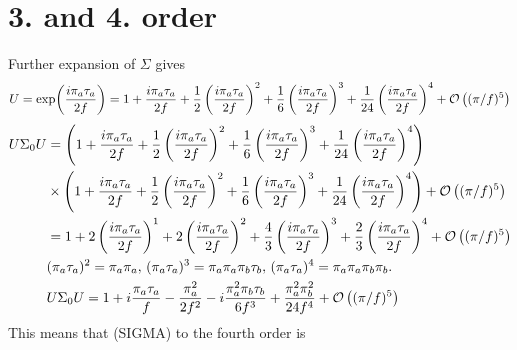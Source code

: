 \documentclass{article}
\begin{document}
\section{3. and 4. order}
Further expansion of $\Sigma$ gives
\begin{align*}
    U = \exp(\frac{i \pi_a \tau_a}{2f}) = 
    1
    + \frac{i \pi_a \tau_a}{2f} 
    + \frac{1}{2}\left(\frac{i \pi_a \tau_a}{2f}\right)^2 
    + \frac{1}{6}\left(\frac{i \pi_a \tau_a}{2f}\right)^3 
    + \frac{1}{24}\left(\frac{i \pi_a \tau_a}{2f}\right)^4 
    + \Oh[5]{(\pi/f)}
\end{align*}
\begin{align*}
    U\Sigma_0U & = 
    \left(
        1
        + \frac{i \pi_a \tau_a}{2f} 
        + \frac{1}{2}\left(\frac{i \pi_a \tau_a}{2f}\right)^2 
        + \frac{1}{6}\left(\frac{i \pi_a \tau_a}{2f}\right)^3 
        + \frac{1}{24}\left(\frac{i \pi_a \tau_a}{2f}\right)^4 
    \right)\\
    & \times
    \left(
        1
        + \frac{i \pi_a \tau_a}{2f} 
        + \frac{1}{2}\left(\frac{i \pi_a \tau_a}{2f}\right)^2 
        + \frac{1}{6}\left(\frac{i \pi_a \tau_a}{2f}\right)^3 
        + \frac{1}{24}\left(\frac{i \pi_a \tau_a}{2f}\right)^4 
    \right)
    + \Oh[5]{(\pi/f)}\\
    &=
    1 + 2 \left( \frac{i \pi_a \tau_a}{2f} \right)^1
    + 2 \left( \frac{i \pi_a \tau_a}{2f} \right)^2
    + \frac{4}{3} \left( \frac{i \pi_a \tau_a}{2f} \right)^3
    + \frac{2}{3} \left( \frac{i \pi_a \tau_a}{2f} \right)^4
    + \Oh[5]{(\pi/f)} \\
    & (\pi_a \tau_a)^2
    = 
    \pi_a \pi_a, \,
    (\pi_a \tau_a)^3
    =
    \pi_a \pi_a \pi_b \tau_b,\,
    (\pi_a \tau_a)^4
    =
    \pi_a \pi_a \pi_b \pi_b. \\
    & U\Sigma_0U 
    =
    1
    + i \frac{\pi_a \tau_a}{f} 
    - \frac{\pi_a^2}{2f^2}
    - i \frac{\pi_a^2\pi_b \tau_b}{6f^3}
    + \frac{\pi_a^2\pi_b^2}{24f^4}
    + \Oh[5]{(\pi/f)}
\end{align*}
This means that (SIGMA) to the fourth order is
\end{document}
